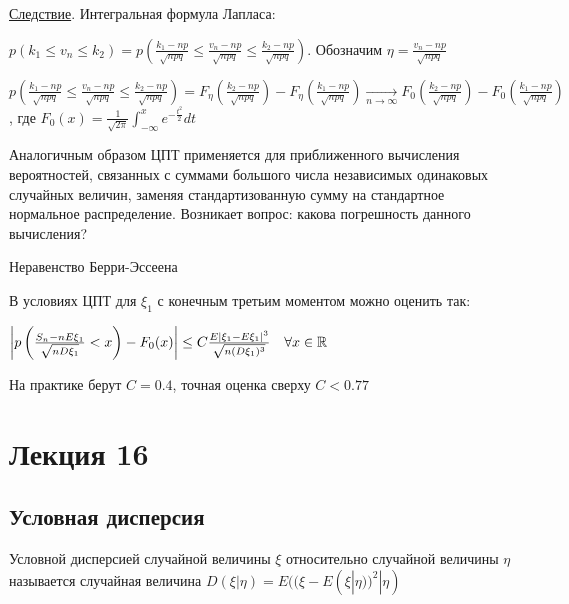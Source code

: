 \documentclass[12pt]{article}
\begin{document}
\underline{Следствие}. Интегральная формула Лапласа:

$p(k_1 \leq v_n \leq k_2) = p\left(\frac{k_1 - np}{\sqrt{npq}} \leq \frac{v_n - np}{\sqrt{npq}} \leq \frac{k_2 - np}{\sqrt{npq}}\right)$. Обозначим $\eta = \frac{v_n - np}{\sqrt{npq}}$

$p\left(\frac{k_1 - np}{\sqrt{npq}} \leq \frac{v_n - np}{\sqrt{npq}} \leq \frac{k_2 - np}{\sqrt{npq}}\right) = F_\eta\left(\frac{k_2 - np}{\sqrt{npq}}\right) - F_\eta\left(\frac{k_1 - np}{\sqrt{npq}}\right) \underset{n \to \infty}{\longrightarrow} F_0\left(\frac{k_2 - np}{\sqrt{npq}}\right) - F_0\left(\frac{k_1 - np}{\sqrt{npq}}\right)$,
где $F_0(x) = \frac{1}{\sqrt{2\pi}} \int_{-\infty}^x e^{-\frac{t^2}{2}} dt$

\Nota Аналогичным образом ЦПТ применяется для приближенного вычисления вероятностей, связанных с суммами большого числа независимых одинаковых случайных величин, заменяя стандартизованную сумму на стандартное нормальное распределение.
Возникает вопрос: какова погрешность данного вычисления?

\hypertarget{berryesseentheorem}{}

\begin{MyTheorem}
    \Ths Неравенство Берри-Эссеена

    В условиях ЦПТ для $\xi_1$ с конечным третьим моментом можно оценить так:

    $\left|p\left(\frac{S_n - nE\xi_1}{\sqrt{nD\xi_1}} < x\right) - F_0(x)\right| \leq C\frac{E|\xi_1 - E\xi_1|^3}{\sqrt{n(D\xi_1)^3}} \quad \forall x \in \mathbb{R}$
\end{MyTheorem}

\Nota На практике берут $C = 0.4$, точная оценка сверху $C < 0.77$







\section{Лекция 16}

\subsection{Условная дисперсия}

\hypertarget{conditionalvariance}{}

\Def Условной дисперсией случайной величины $\xi$ относительно случайной величины $\eta$ называется случайная величина 
$D(\xi | \eta) = E((\xi - E(\xi | \eta))^2 | \eta)$
\end{document}
